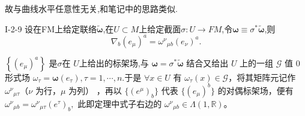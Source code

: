 \documentclass[../main.tex]{subfiles}
\begin{document}
故与曲线水平任意性无关,和笔记中的思路类似.
\begin{theorem}
  {}{I-2-9}
  设在FM上给定联络$\bm{\tilde{\omega}} $,在$U \subset M$上给定截面$\sigma:U \to FM$,令$\bm{\omega} \equiv \sigma^* \bm{\tilde{\omega}}$,则\[
 \nabla_b(e_\mu)^a = \omega^{\nu}{}_{\mu b}(e_\nu)^a 
  .\] 
\end{theorem}
$\left\{ (e_\mu)^a \right\} $ 是$\sigma$在 $U$上给出的标架场,与 \(\bm{\omega} = \sigma^* \tilde{\bm{\omega}}\) 结合又给出 \(U\) 上的一组 \(\mathscr{G}\) 值 0形式场
\(\omega_\tau = \bm{\omega}(e_\tau), \tau=1, \cdots, n\).于是 \(\forall x \in U\) 有 \(\omega_\tau(x) \in \mathscr{G}\)，将其矩阵元记作 \(\omega^\nu{}_{\mu\tau}\)（\(\nu\) 为行，\(\mu\) 为列）
，再以 \(\{(e^\mu)_b\}\) 代表 \(\{(e_\mu)^b\}\) 的对偶标架场，便有  
\(
\omega^\nu{}_{\mu b} = \omega^\nu{}_{\mu\tau}(e^\tau)_b,
\)  
此即定理中式子右边的 \(\omega^\nu{}_{\mu b} \in \Lambda(1,\mathbb{R})\)。
\end{document}
